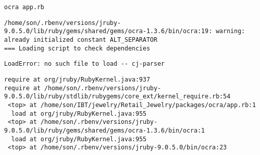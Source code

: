 \documentclass[11pt]{article}
\begin{document}
\begin{verbatim}
ocra app.rb
\end{verbatim}

\begin{verbatim}
/home/son/.rbenv/versions/jruby-9.0.5.0/lib/ruby/gems/shared/gems/ocra-1.3.6/bin/ocra:19: warning: already initialized constant ALT_SEPARATOR
=== Loading script to check dependencies
\end{verbatim}

\begin{verbatim}
LoadError: no such file to load -- cj-parser
\end{verbatim}

\begin{verbatim}
require at org/jruby/RubyKernel.java:937
require at /home/son/.rbenv/versions/jruby-9.0.5.0/lib/ruby/stdlib/rubygems/core_ext/kernel_require.rb:54
 <top> at /home/son/IBT/jewelry/Retail_Jewelry/packages/ocra/app.rb:1
  load at org/jruby/RubyKernel.java:955
 <top> at /home/son/.rbenv/versions/jruby-9.0.5.0/lib/ruby/gems/shared/gems/ocra-1.3.6/bin/ocra:1
  load at org/jruby/RubyKernel.java:955
 <top> at /home/son/.rbenv/versions/jruby-9.0.5.0/bin/ocra:23
\end{verbatim}
\end{document}
